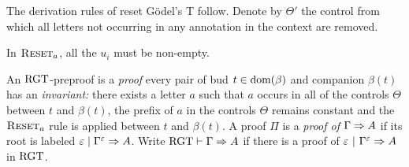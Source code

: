 \begin{definition}
  The derivation rules of reset Gödel's T follow. Denote by $\Theta'$ the
  control from which all letters not occurring in any annotation in the context
  are removed.
  \begin{mathpar}










  \end{mathpar}
  In $\RReset_a$, all the $u_i$ must be non-empty.

  An \( \RGT \)-preproof is a \emph{proof}
  every pair of bud $t
  \in \dom(\beta)$ and companion $\beta(t)$ has an \emph{invariant}\emph{:}
  there
  exists a letter $a$ such that $a$ occurs in all of the controls
  $\Theta$ between $t$ and $\beta(t)$, the prefix of $a$ in the controls
  $\Theta$ remains constant and the $\textsc{Reset}_a$ rule
  is applied between $t$ and $\beta(t)$.
  A proof $\Pi$ is a \emph{proof of}
  $\Gamma \sdash A$ if its root
  is labeled $\varepsilon \rsep \Gamma^\varepsilon \sdash A$.
  Write $\RGT \vdash \Gamma \sdash A$ if there is a proof of
  $\varepsilon ~|~ \Gamma^\varepsilon \sdash A$ in $\RGT$.
\end{definition}

